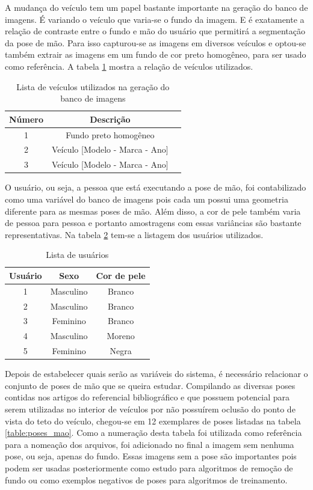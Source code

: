 A mudança do veículo tem um papel bastante importante na geração do banco de imagens. É variando o veículo que varia-se o fundo da imagem. E é exatamente a relação de contraste entre o fundo e mão do usuário que permitirá a segmentação da pose de mão. Para isso capturou-se as imagens em diversos veículos e optou-se também extrair as imagens em um fundo de cor preto homogêneo, para ser usado como referência. A tabela \ref{table:veiculos} mostra a relação de veículos utilizados.

\begin{table}[h]
	\centering
	\begin{tabular}{|c|c|c|}
		\hline Número & Descrição	 					\\
		\hline 1 & Fundo preto homogêneo				\\
		\hline 2 & Veículo [Modelo - Marca - Ano]		\\
		\hline 3 & Veículo [Modelo - Marca - Ano]		\\
		\hline
	\end{tabular}
	\caption{Lista de veículos utilizados na geração do banco de imagens}
	\label{table:veiculos}
\end{table}

O usuário, ou seja, a pessoa que está executando a pose de mão, foi contabilizado como uma variável do banco de imagens pois cada um possui uma geometria diferente para as mesmas poses de mão. Além disso, a cor de pele também varia de pessoa para pessoa e portanto amostragens com essas variâncias são bastante representativas. Na tabela \ref{table:usuarios} tem-se a listagem dos usuários utilizados.

\begin{table}[h]
	\centering
	\begin{tabular}{|c|c|c|}
		\hline Usuário 	& Sexo 		& Cor de pele 	\\
		\hline 1 		& Masculino & Branco 		\\
		\hline 2 		& Masculino & Branco 		\\
		\hline 3 		& Feminino 	& Branco 		\\
		\hline 4 		& Masculino & Moreno 		\\
		\hline 5 		& Feminino 	& Negra 		\\
		\hline
	\end{tabular}
	\caption{Lista de usuários}
	\label{table:usuarios}
\end{table}

Depois de estabelecer quais serão as variáveis do sistema, é necessário relacionar o conjunto de poses de mão que se queira estudar. Compilando as diversas poses contidas nos artigos do referencial bibliográfico e que possuem potencial para serem utilizadas no interior de veículos por não possuírem oclusão do ponto de vista do teto do veículo, chegou-se em 12 exemplares de poses listadas na tabela \ref{table:poses_mao}. Como a numeração desta tabela foi utilizada como referência para a nomeação dos arquivos, foi adicionado no final a imagem sem nenhuma pose, ou seja, apenas do fundo. Essas imagens sem a pose são importantes pois podem ser usadas posteriormente como estudo para algoritmos de remoção de fundo ou como exemplos negativos de poses para algoritmos de treinamento.


